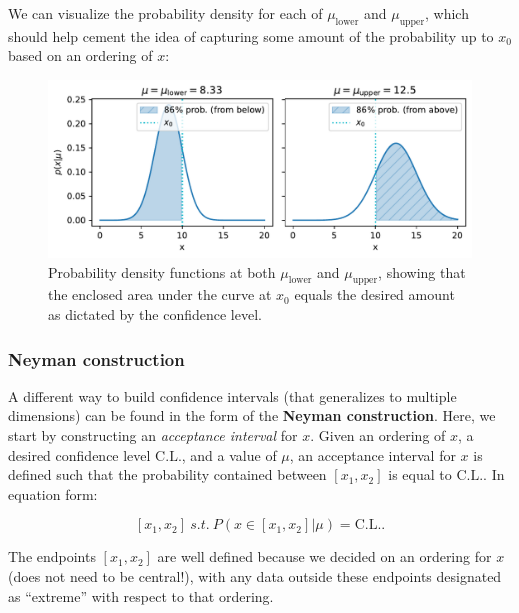 \documentclass[
  11pt,
  numbers=noendperiod]{book}
\begin{document}
We can visualize the probability density for each of
\(\mu_{\mathrm{lower}}\) and \(\mu_{\mathrm{upper}}\), which should help
cement the idea of capturing some amount of the probability up to
\(x_0\) based on an ordering of \(x\):

\begin{figure}

{\centering \includegraphics{./stat-fundamentals_files/figure-pdf/fig-uplow-output-1.pdf}

}

\caption{\label{fig-uplow}Probability density functions at both
\(\mu_{\mathrm{lower}}\) and \(\mu_{\mathrm{upper}}\), showing that the
enclosed area under the curve at \(x_0\) equals the desired amount as
dictated by the confidence level.}

\end{figure}

\hypertarget{neyman-construction}{%
\subsubsection*{Neyman construction}\label{neyman-construction}}

A different way to build confidence intervals (that generalizes to
multiple dimensions) can be found in the form of the \textbf{Neyman
construction}. Here, we start by constructing an \emph{acceptance
interval} for \(x\). Given an ordering of \(x\), a desired confidence
level \(\mathrm{C.L.}\), and a value of \(\mu\), an acceptance interval
for \(x\) is defined such that the probability contained between
\([x_1, x_2]\) is equal to \(\mathrm{C.L.}\). In equation form:

\[ [x_1, x_2]~s.t.~P(x\in[x_1,x_2] | \mu) = \mathrm{C.L.} .\]

The endpoints \([x_1, x_2]\) are well defined because we decided on an
ordering for \(x\) (does not need to be central!), with any data outside
these endpoints designated as ``extreme'' with respect to that ordering.
\end{document}
